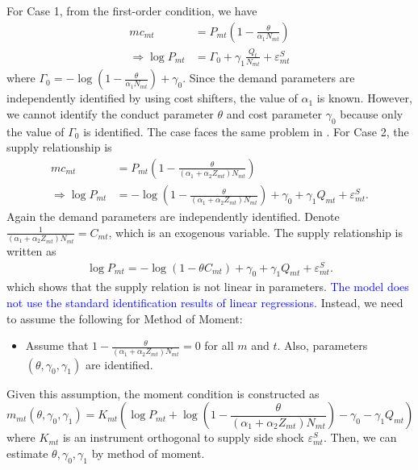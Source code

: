 \documentclass[11pt]{article}
\begin{document}
For Case 1, from the first-order condition, we have
    \begin{align*}
        mc_{mt}& = P_{mt}\left( 1-\frac{\theta}{\alpha_1 N_{mt}} \right)\\
        \Longrightarrow\log P_{mt}  &=  \Gamma_0 + \gamma_1 \frac{Q_t}{N_{mt}} +\varepsilon_{mt}^{S} 
    \end{align*}
    where $\Gamma_0 = -\log \left( 1-\frac{\theta}{\alpha_1 N_{mt}} \right) +\gamma_0$.
    Since the demand parameters are independently identified by using cost shifters, the value of $\alpha_1$ is known. However, we cannot identify the conduct parameter $\theta$ and cost parameter $\gamma_0$ because only the value of $\Gamma_0$ is identified. The case faces the same problem in \cite{bresnahan1982oligopoly}.
    For Case 2, the supply relationship is 
    \begin{align*}
            mc_{mt}& = P_{mt}\left(  1 - \frac{\theta}{(\alpha_1+\alpha_2 Z_{mt})N_{mt}} \right)\\
            \Longrightarrow \log P_{mt}& = -\log \left(  1 - \frac{\theta}{(\alpha_1+\alpha_2 Z_{mt})N_{mt}} \right) +\gamma_0 + \gamma_1 Q_{mt} + \varepsilon_{mt}^{S}. 
    \end{align*}
    Again the demand parameters are independently identified. Denote $\frac{1}{(\alpha_1+\alpha_2 Z_{mt})N_{mt}} = C_{mt}$, which is an exogenous variable. The supply relationship is written as 
    \begin{align*}
        \log P_{mt} = -\log \left(  1 - \theta C_{mt} \right) +\gamma_0 + \gamma_1 Q_{mt} + \varepsilon_{mt}^{S}. 
    \end{align*}
    which shows that the supply relation is not linear in parameters. \textcolor{blue}{The model does not use the standard identification results of linear regressions.} Instead, we need to assume the following for Method of Moment:
    \begin{itemize}
        \item Assume that $1 - \frac{\theta}{(\alpha_1+\alpha_2 Z_{mt})N_{mt}}=0$ for all $m$ and $t$. Also, parameters $(\theta,\gamma_0,\gamma_1)$ are identified.
    \end{itemize}
    Given this assumption, the moment condition is constructed as $$m_{mt}(\theta,\gamma_0,\gamma_1)=K_{mt}\left(\log P_{mt} +\log \left(  1 - \frac{\theta}{(\alpha_1+\alpha_2 Z_{mt})N_{mt}} \right) -\gamma_0 - \gamma_1 Q_{mt}\right)$$ where $K_{mt}$ is an instrument orthogonal to supply side shock $\varepsilon_{mt}^{S}$. Then, we can estimate $\theta,\gamma_0,\gamma_1$ by method of moment.
\end{document}
